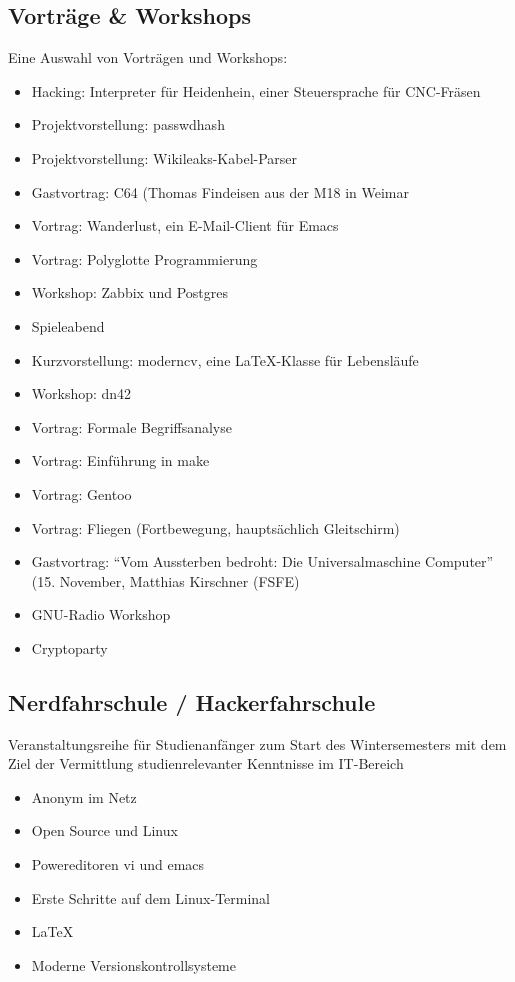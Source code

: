 \documentclass[10pt, a4paper]{scrartcl}
\begin{document}
\subsection*{Vorträge \& Workshops}
Eine Auswahl von Vorträgen und Workshops:
\begin{itemize}
	\item Hacking: Interpreter für Heidenhein, einer Steuersprache für CNC-Fräsen
	\item Projektvorstellung: passwdhash
	\item Projektvorstellung: Wikileaks-Kabel-Parser
	\item Gastvortrag: C64 (Thomas Findeisen aus der M18 in Weimar
	\item Vortrag: Wanderlust, ein E-Mail-Client für Emacs
	\item Vortrag: Polyglotte Programmierung
	\item Workshop: Zabbix und Postgres
	\item Spieleabend
	\item Kurzvorstellung: moderncv, eine \LaTeX-Klasse für Lebensläufe
	\item Workshop: dn42
	\item Vortrag: Formale Begriffsanalyse
	\item Vortrag: Einführung in make
	\item Vortrag: Gentoo
	\item Vortrag: Fliegen (Fortbewegung, hauptsächlich Gleitschirm)
	\item Gastvortrag: "`Vom Aussterben bedroht: Die Universalmaschine Computer"'
		(15. November, Matthias Kirschner (FSFE)
	\item GNU-Radio Workshop
	\item Cryptoparty
\end{itemize}

\subsection*{Nerdfahrschule / Hackerfahrschule}
Veranstaltungsreihe für Studienanfänger zum Start des Wintersemesters
mit dem Ziel der Vermittlung studienrelevanter Kenntnisse im IT-Bereich
\begin{itemize}
	\item Anonym im Netz
	\item Open Source und Linux
	\item Powereditoren vi und emacs
	\item Erste Schritte auf dem Linux-Terminal
	\item \LaTeX
	\item Moderne Versionskontrollsysteme
\end{itemize}
\end{document}
